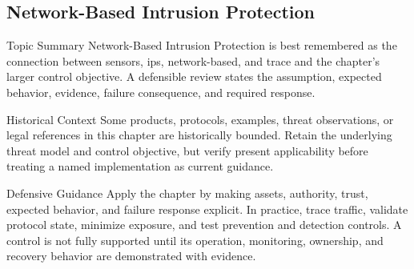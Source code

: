 \documentclass[11pt,letterpaper]{article}
\begin{document}
\subsection*{Network-Based Intrusion Protection}
\begin{CornellNotesTable}
\end{CornellNotesTable}
\begin{CornellSummaryBox}{Topic Summary}
Network-Based Intrusion Protection is best remembered as the connection between sensors, ips, network-based, and trace and the chapter's larger control objective. A defensible review states the assumption, expected behavior, evidence, failure consequence, and required response.
\end{CornellSummaryBox}
\begin{CornellWarningBox}{Historical Context}
Some products, protocols, examples, threat observations, or legal references in this chapter are historically bounded. Retain the underlying threat model and control objective, but verify present applicability before treating a named implementation as current guidance.
\end{CornellWarningBox}
\begin{CornellOverviewBox}{Defensive Guidance}
Apply the chapter by making assets, authority, trust, expected behavior, and failure response explicit. In practice, trace traffic, validate protocol state, minimize exposure, and test prevention and detection controls. A control is not fully supported until its operation, monitoring, ownership, and recovery behavior are demonstrated with evidence.
\end{CornellOverviewBox}
\end{document}
